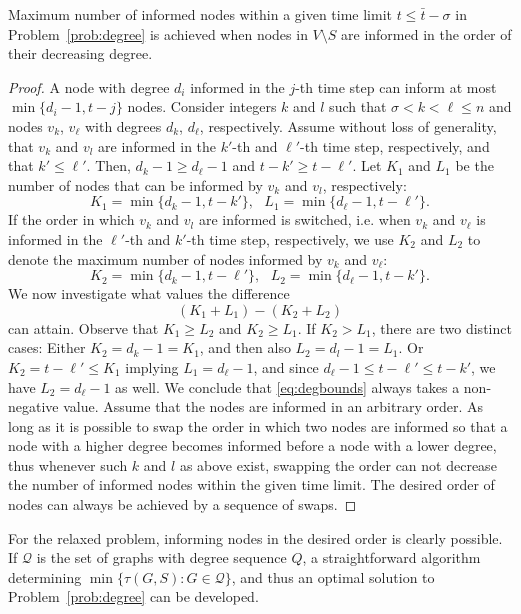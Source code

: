 \begin{lemma}
\label{lemma:degorder}
Maximum number of informed nodes within a given time limit $t\leq \bar{t} - \sigma$ in Problem~\ref{prob:degree} is achieved when nodes in $V\setminus S$ are informed 
in the order of their decreasing degree.
\end{lemma}
\begin{proof}

A node with degree $d_i$ informed in the $j$-th time step can inform at most $\min\{d_i-1,t-j\}$ nodes.
Consider integers  $k$ and $l$ such that $\sigma< k < \ell\leq n$ and nodes $v_k$, $v_\ell$ with degrees $d_k$, $d_\ell$, respectively.
Assume without loss of generality, that $v_k$ and $v_l$ are informed in the $k'$-th and $\ell'$-th time step, respectively, and that $k'\leq\ell'$.
Then, $d_k-1\geq d_\ell-1$ and $t-k' \geq t-\ell'$.
Let $K_1$ and $L_1$ be the number of nodes that can be informed by $v_k$ and $v_l$, respectively:
$$
K_1=\min\{d_k-1,t-k'\}, ~~~ L_1=\min\{d_\ell-1,t-\ell'\}.
$$
If the order in which $v_k$ and $v_l$ are informed is switched, i.e. when $v_k$ and $v_\ell$ is informed in the $\ell'$-th and $k'$-th time step, respectively, 
we use $K_2$ and $L_2$ to denote the maximum number of nodes informed by $v_k$ and $v_\ell$:
$$
K_2=\min\{d_k-1,t-\ell'\}, ~~~ L_2=\min\{d_\ell-1,t-k'\}.
$$
We now investigate what values the difference 
\begin{equation}
\label{eq:degbounds}
(K_1+L_1)-(K_2+L_2)
\end{equation}
can attain.
Observe that $K_1\geq L_2$ and $K_2\geq L_1$. 
If $K_2>L_1$, there are two distinct cases:
Either $K_2=d_k-1=K_1$, and then also $L_2=d_l-1=L_1$.
	Or $K_2=t-\ell'\leq K_1$ implying $L_1 =d_\ell-1$, and since $d_\ell-1\leq t-\ell'\leq t-k'$, we have $L_2=d_\ell-1$ as well.
We conclude that \eqref{eq:degbounds} always takes a non-negative value.
Assume that the nodes are informed in an arbitrary order.
As long as it is possible to swap the order in which two nodes are informed so that a node with a higher degree becomes informed before a node with a lower degree,
thus whenever such $k$ and $l$ as above exist, swapping the order can not decrease the number of informed nodes within the given time limit.
The desired order of nodes can always be achieved by a sequence of swaps.
\end{proof}
For the relaxed problem, informing nodes in the desired order is clearly possible.
If $\mathcal{Q}$ is the set of graphs with degree sequence $Q$, a straightforward algorithm determining
$\min\{\tau(G,S): G\in \mathcal{Q}\}$,
and thus an optimal solution to Problem~\ref{prob:degree} can be developed.


